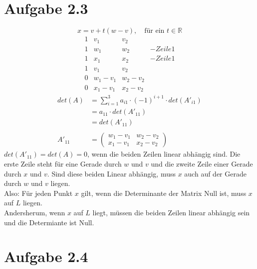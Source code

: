 \documentclass{article} %
\begin{document}
\section{Aufgabe 2.3}
\[
x=v+t(w-v), \quad \text{für ein } t \in \mathbb{R}
\] 
\[
\begin{array}{rrrr}
     1& v_1 & v_2 \\
     1 & w_1 & w_2 & -Zeile1 \\
     1  & x_1 & x_2 & -Zeile1  \\ \hline
     1& v_1 & v_2 \\
      0& w_1 - v_1 & w_2 -v_2 \\
       0& x_1 -v_1 & x_2 - v_2 
\end{array}
\]
\begin{align*}
    det(A) &=   \sum^3_{i=1} a_{i1} \cdot (-1)^{i+1} \cdot det(A'_{i1}) \\
    & = a_{11} \cdot det(A'_{11}) \\
    & = det(A'_{11})  \\ \\
   A'_{11} & = \begin{pmatrix}
       w_1 - v_1 & w_2 -v_2 \\
       x_1 -v_1 & x_2 - v_2 
    \end{pmatrix} %
\end{align*}
$det(A'_{11}) = det (A) = 0$, wenn die beiden Zeilen linear abhängig sind. Die erste Zeile steht für eine Gerade durch $w$ und $v$ und die zweite Zeile einer Gerade durch $x$ und $v$. Sind diese beiden Linear abhängig, muss $x$ auch auf der Gerade durch $w$ und $v$ liegen. \\
Also: Für jeden Punkt $x$ gilt, wenn die Determinante der Matrix Null ist, muss $x$ auf $L$ liegen. \\
Andersherum, wenn $x$ auf $L$ liegt, müssen die beiden Zeilen linear abhängig sein und die Determiante ist Null. 

\section{Aufgabe 2.4}
\end{document}
